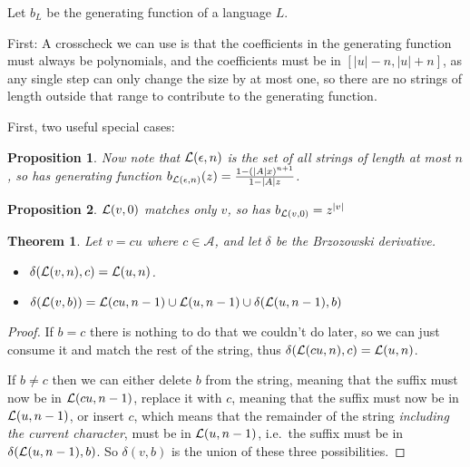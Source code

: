 \documentclass[a4paper]{book}
\newtheorem{proposition}{Proposition}[section]
\newtheorem{theorem}{Theorem}[section]
\begin{document}
Let \(b_L\) be the generating function of a language \(L\).

First: A crosscheck we can use is that the coefficients in the generating function must always be polynomials,
and the coefficients must be in \([|u| - n, |u| + n]\),
as any single step can only change the size by at most one,
so there are no strings of length outside that range to contribute to the generating function.

First,
two useful special cases:

\begin{proposition}
Now note that \(\mathcal{L} (\epsilon, n)\) is the set of all strings of length at most \(n\),
so has generating function \(b_{\mathcal{L} (\epsilon, n)}(z) = \frac{1 - {(|A|x)}^{n + 1}}{1 - |A| z}\).
\end{proposition}

\begin{proposition}
\(\mathcal{L} (v, 0)\) matches only \(v\),
so has \(b_{\mathcal{L} (v, 0)} = z^{|v|}\) 
\end{proposition}

\begin{theorem}
Let \(v = cu\) where \(c \in \mathcal{A}\),
and let \(\delta\) be the Brzozowski derivative.

\begin{itemize}
\item \(\delta(\mathcal{L} (v, n), c) = \mathcal{L} (u, n)\).
\item \(\delta(\mathcal{L} (v, b)) = \mathcal{L} (cu, n - 1) \cup \mathcal{L} (u, n - 1) \cup \delta(\mathcal{L} (u, n - 1), b)\)
\end{itemize}

\end{theorem}

\begin{proof}
If \(b = c\) there is nothing to do that we couldn't do later,
so we can just consume it and match the rest of the string,
thus \(\delta(\mathcal{L} (cu, n), c) = \mathcal{L} (u, n)\).

If \(b \neq c\) then we can either delete \(b\) from the string,
meaning that the suffix must now be in \(\mathcal{L} (cu, n - 1)\),
replace it with \(c\),
meaning that the suffix must now be in \(\mathcal{L} (u, n - 1)\),
or insert \(c\),
which means that the remainder of the string \emph{including the current character},
must be in \(\mathcal{L} (u, n - 1)\),
i.e.\ the suffix must be in \(\delta(\mathcal{L} (u, n - 1), b)\).
So \(\delta(v, b)\) is the union of these three possibilities.
\end{proof}
\end{document}
